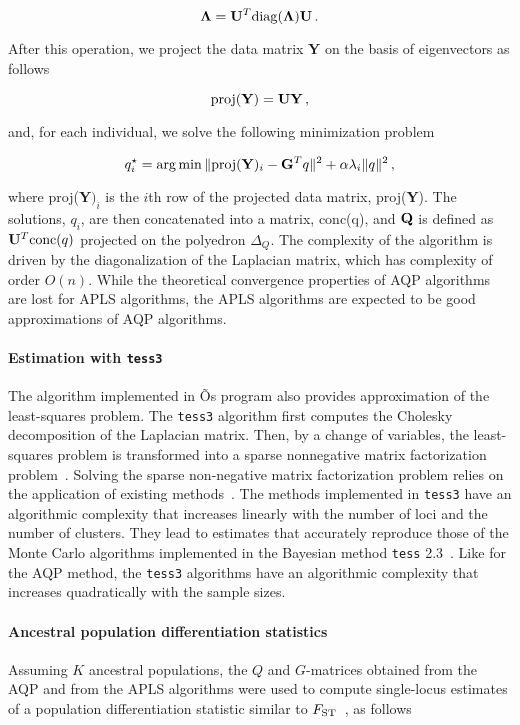 $$
{\bf \Lambda} = {\bf U}^T {\rm diag}({\bf \Lambda}) {\bf U} \, .
$$

\noindent  After this operation, we project the data matrix {\bf Y} on the basis of eigenvectors as follows

$$
{\rm proj} ({\bf Y}) = {\bf U}{\bf Y} \, , 
$$

\noindent and, for each individual, we solve the following minimization problem

$$
q_i^\star = \arg \min  \|  {\rm proj} ({\bf Y})_i  - {\bf G}^Tq \|^2 + \alpha \lambda_i   \| q \|^2  \, ,
$$

\noindent where  proj({\bf Y}$)_i$ is the $i$th row of the projected data matrix, proj({\bf Y}). The solutions, $q_i$, are then concatenated into a matrix, {\rm conc}(q), and ${\bf Q}$ is defined as ${\bf U}^T {\rm conc}(q)$ projected on the polyedron $\Delta_Q$. The complexity of the algorithm is driven by the diagonalization of the Laplacian matrix, which has complexity of order $O(n)$. While the theoretical convergence properties of AQP algorithms are lost for APLS algorithms, the APLS algorithms are expected to be good approximations of AQP algorithms.



\paragraph{Estimation with {\tt tess3}}  The algorithm implemented in \cite{Caye2016}Õs  program also provides approximation of the least-squares problem. The {\tt tess3} algorithm first computes the Cholesky decomposition of the Laplacian matrix. Then, by a change of variables, the least-squares problem is transformed into a sparse nonnegative matrix factorization problem~\citep{Caye2016}.  Solving the sparse non-negative matrix factorization problem relies on the application of existing methods~\citep{Kim2011, Frichot2014}. The methods implemented in {\tt tess3} have an algorithmic complexity that increases linearly with the number of loci and the number of clusters. They lead to estimates that accurately reproduce those of the Monte Carlo algorithms implemented in the Bayesian method {\tt tess} 2.3~\citep{Caye2016}. Like for the AQP method, the {\tt tess3} algorithms have an algorithmic complexity that increases quadratically with the sample sizes.  




\paragraph{Ancestral population differentiation statistics} Assuming $K$ ancestral populations, the $Q$ and $G$-matrices  obtained from the AQP and from the APLS algorithms were used to compute single-locus estimates of a population differentiation statistic similar to $F_{\rm ST}$~\citep{Martins2016}, as follows

